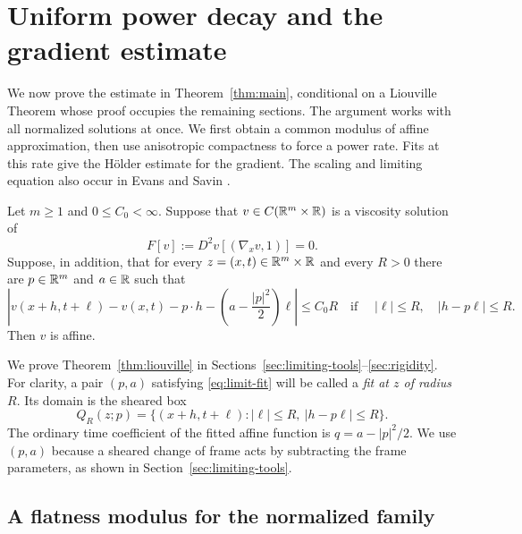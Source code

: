 \section{Uniform power decay and the gradient estimate}\label{sec:reduction}

We now prove the estimate in Theorem~\ref{thm:main}, conditional on a Liouville Theorem whose proof occupies the remaining sections. The argument works with all normalized solutions at once. We first obtain a common modulus of affine approximation, then use anisotropic compactness to force a power rate. Fits at this rate give the H\"older estimate for the gradient. The scaling and limiting equation also occur in Evans and Savin \cite[Sections~2.3--2.4]{EvansSavin2008}.

\begin{theorem}\label{thm:liouville}
Let $m\ge1$ and $0\le C_0<\infty$. Suppose that $v\in C(\mathbb{R}^m\times\mathbb{R})$ is a viscosity solution of
\begin{equation}\label{eq:limit-pde}
  F[v]:=D^2v[(\nabla_xv,1)]=0.
\end{equation}
Suppose, in addition, that for every $z=(x,t)\in\mathbb{R}^m\times\mathbb{R}$ and every $R>0$ there are $p\in\mathbb{R}^m$ and $a\in\mathbb{R}$ such that
\begin{equation}\label{eq:limit-fit}
  \left|v(x+h,t+\ell)-v(x,t)-p\cdot h
       -\left(a-\frac{|p|^2}{2}\right)\ell\right|\le C_0R
  \quad\text{if }\quad |\ell|\le R,\quad |h-p\ell|\le R.
\end{equation}
Then $v$ is affine.
\end{theorem}

We prove Theorem~\ref{thm:liouville} in Sections~\ref{sec:limiting-tools}--\ref{sec:rigidity}. For clarity, a pair $(p,a)$ satisfying \eqref{eq:limit-fit} will be called a \emph{fit at $z$ of radius $R$}. Its domain is the sheared box
\[
  Q_R(z;p)=\{(x+h,t+\ell): |\ell|\le R,\ |h-p\ell|\le R\}.
\]
The ordinary time coefficient of the fitted affine function is $q=a-|p|^2/2$. We use $(p,a)$ because a sheared change of frame acts by subtracting the frame parameters, as shown in Section~\ref{sec:limiting-tools}.

\subsection{A flatness modulus for the normalized family}

